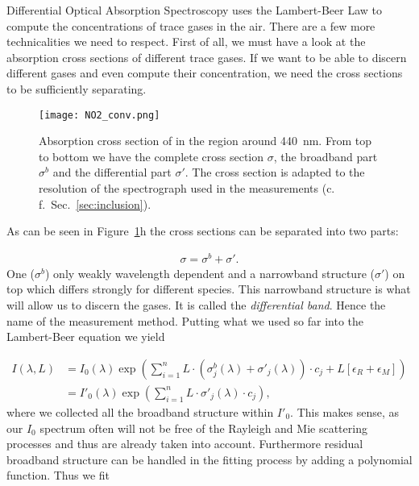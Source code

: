 Differential Optical Absorption Spectroscopy uses the Lambert-Beer Law
to compute the concentrations of trace gases in the air. There are a
few more technicalities we need to respect. First of all, we must have
a look at the absorption cross sections of different trace gases. If we
want to be able to discern different gases and even compute their
concentration, we need the cross sections to be sufficiently
separating.

\begin{figure}[htbp]
  \centering
  \texttt{[image: NO2\_conv.png]}
  \caption{Absorption cross section of  in the region around
    \SI{440}{\nano\meter}. From top to bottom we have the complete
    cross section $\sigma$, the broadband part $\sigma^b$ and the
    differential part $\sigma'$. The cross section is adapted to the
    resolution of the spectrograph used in the measurements
    (c.\,f.\ Sec.~\ref{sec:inclusion}).}
  \label{fig:no2-cross}
\end{figure}

As can be seen in Figure~\ref{fig:no2-cross}h the
cross sections can be separated into two parts: 

\begin{align*}
  \sigma = \sigma^b + \sigma'.
\end{align*}
One ($\sigma^b$) only weakly
wavelength dependent and a narrowband
structure ($\sigma'$) on top which differs strongly for different species. This
narrowband structure is what will allow us to discern the gases. It is
called the \emph{differential band}. Hence the name of the measurement
method. Putting what we used so far into the Lambert-Beer equation we
yield

\begin{align*}
  I(\lambda, L) & = I_0(\lambda) \exp \left ( \sum_{i=1}^n L \cdot
                  (\sigma^b_j(\lambda) + \sigma'_j(\lambda))\cdot c_j + L[\epsilon_R +
                  \epsilon_M]\right) \\
                & = I'_0(\lambda) \exp \left( \sum_{i=1}^n L \cdot
                  \sigma'_j(\lambda) \cdot c_j \right),
\end{align*}
where we collected all the broadband structure within $I'_0$. This
makes sense, as our $I_0$ spectrum often will not be free of the Rayleigh
and Mie scattering processes and thus are already taken into
account. Furthermore residual broadband structure can be handled in
the fitting process by adding a polynomial function. Thus we fit

